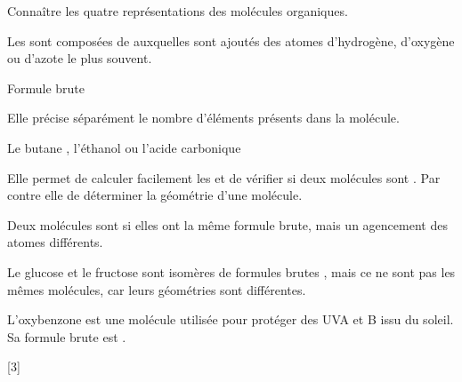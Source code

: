 \tetePremStssOrga
\vspace*{-30pt}

\begin{objectifs}
  \item Connaître les quatre représentations des molécules organiques.
\end{objectifs}

\begin{contexte}
  Les  sont composées de  auxquelles sont ajoutés des atomes d'hydrogène, d'oxygène ou d'azote le plus souvent.
  
\end{contexte}

\vspace*{-12pt}

\vspace*{-8pt}
\begin{doc}{Formule brute}
  \begin{importants}
    Elle précise séparément le nombre d'éléments présents dans la molécule.
  \end{importants}
  \exemple* Le butane , l'éthanol  ou l'acide carbonique 
  
  Elle permet de calculer facilement les  et de vérifier si deux molécules sont .
  Par contre elle  de déterminer la géométrie d'une molécule.

  \begin{importants}
    Deux molécules sont  si elles ont la même formule brute, mais un agencement des atomes différents.
  \end{importants}
  \exemple* Le glucose et le fructose sont isomères de formules brutes , mais ce ne sont pas les mêmes molécules, car leurs géométries sont différentes.
\end{doc}

L'oxybenzone est une molécule utilisée pour protéger des UVA et B issu du soleil.
Sa formule brute est .

[3]

